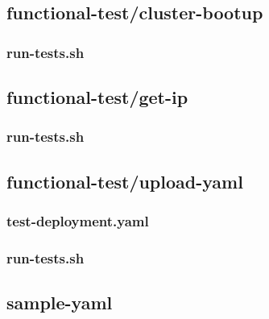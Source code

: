 
\subsection{functional-test/cluster-bootup}
\noindent

\subsubsection{run-tests.sh}
\noindent




\subsection{functional-test/get-ip}
\noindent

\subsubsection{run-tests.sh}
\noindent





\subsection{functional-test/upload-yaml}

\subsubsection{test-deployment.yaml}
\noindent



\subsubsection{run-tests.sh}
\noindent







\subsection{sample-yaml}
\noindent

